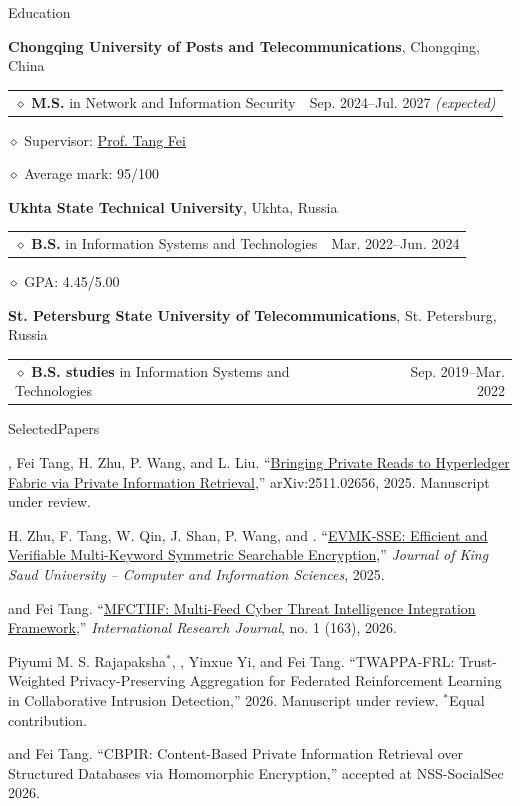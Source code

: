 \documentclass[11pt,a4paper]{article}
\makeatletter
\newcommand{\cvrow}[2]{%
  \noindent
  \begin{minipage}[t]{0.145\textwidth}
    \vspace{0pt}%
    \raggedright
    \fontsize{10.5}{12.5}\selectfont
    #1
  \end{minipage}%
  \hfill
  \begin{minipage}[t]{0.835\textwidth}
    \vspace{0pt}%
    #2
  \end{minipage}\par
}
\newcommand{\pub}[2]{%
  #1 #2\par
  \vspace{0.28em}
}
\newcommand{\eduentry}[2]{%
  \noindent
  \begin{tabularx}{\linewidth}
    {@{}X@{\hspace{0.8em}}r@{}}
    #1 & \small #2
  \end{tabularx}\par
  \vspace{0.15em}
}
\newcommand{\edudetail}[1]{%
  \noindent\hspace*{1.15em}$\diamond$ #1\par
}
\makeatother
\begin{document}
\cvrow{Education}{%
  \raggedright

  \textbf{Chongqing University of Posts and Telecommunications},
  Chongqing, China\par
  \vspace{0.12em}

  \eduentry
    {$\diamond$ \textbf{M.S.} in Network and Information Security}
    {Sep. 2024--Jul. 2027 \textit{(expected)}}

  \edudetail{Supervisor:
    \href{https://faculty.cqupt.edu.cn/tangfei/en/index.htm}{Prof. Tang Fei}}
  \edudetail{Average mark: 95/100}

  \vspace{0.48em}

  \textbf{Ukhta State Technical University},
  Ukhta, Russia\par
  \vspace{0.12em}

  \eduentry
    {$\diamond$ \textbf{B.S.} in Information Systems and Technologies}
    {Mar. 2022--Jun. 2024}

  \edudetail{GPA: 4.45/5.00}

  \vspace{0.48em}

  \textbf{St. Petersburg State University of Telecommunications},
  St. Petersburg, Russia\par
  \vspace{0.12em}

  \eduentry
    {$\diamond$ \textbf{B.S. studies} in Information Systems and Technologies}
    {Sep. 2019--Mar. 2022}
}

\vspace{0.75em}

\cvrow{Selected\newline Papers}{%
  \pub{\underbar{Artur Iasenovets}, Fei Tang, H. Zhu, P. Wang, and L. Liu.}
  {``\href{https://arxiv.org/abs/2511.02656}
  {Bringing Private Reads to Hyperledger Fabric via Private Information Retrieval},''
  arXiv:2511.02656, 2025. Manuscript under review.}

  \pub{H. Zhu, F. Tang, W. Qin, J. Shan, P. Wang, and \underbar{Artur Iasenovets}.}
  {``\href{https://doi.org/10.1007/s44443-025-00405-8}
  {EVMK-SSE: Efficient and Verifiable Multi-Keyword Symmetric Searchable Encryption},''
  \textit{Journal of King Saud University -- Computer and Information Sciences}, 2025.}

  \pub{\underbar{Artur Iasenovets} and Fei Tang.}
  {``\href{https://doi.org/10.60797/IRJ.2026.163.57}
  {MFCTIIF: Multi-Feed Cyber Threat Intelligence Integration Framework},''
  \textit{International Research Journal}, no. 1 (163), 2026.}

  \pub{Piyumi M. S. Rajapaksha$^{*}$, \underbar{Artur Iasenovets$^{*}$},
  Yinxue Yi, and Fei Tang.}
  {``TWAPPA-FRL: Trust-Weighted Privacy-Preserving Aggregation for Federated
  Reinforcement Learning in Collaborative Intrusion Detection,''
  2026. Manuscript under review. $^{*}$Equal contribution.}

  \pub{\underbar{Artur Iasenovets} and Fei Tang.}
  {``CBPIR: Content-Based Private Information Retrieval over Structured Databases via
  Homomorphic Encryption,'' accepted at NSS-SocialSec 2026.}
}
\end{document}
